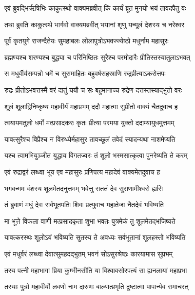 
\twolineshloka
{एवं ब्रुवद्भिर्ऋषिभिः काकुत्स्थो वाक्यमब्रवीत्}
{किं कार्यं ब्रूत मुनयो भयं तावदपैतु वः} %

\twolineshloka
{तथा ब्रुवति काकुत्स्थे भार्गवो वाक्यमब्रवीत्}
{भयानां शृणु यन्मूलं देशस्य च नरेश्वर} %

\twolineshloka
{पूर्वं कृतयुगे राजन्दैतेयः सुमहाबलः}
{लोलापुत्रोऽभवज्ज्येष्ठो मधुर्नाम महासुरः} %

\twolineshloka
{ब्रह्मण्यश्च शरण्यश्च बुद्ध्या च परिनिष्ठितः}
{सुरैश्च परमोदारैः प्रीतिस्तस्यातुलाऽभवत्} %

\twolineshloka
{स मधुर्वीर्यसम्पन्नो धर्मे च सुसमाहितः}
{बहुवर्षसहस्राणि रुद्रप्रीत्याऽकरोत्तपः} %

\twolineshloka
{रुद्रः प्रीतोऽभवत्तस्मै वरं दातुं ययौ च सः}
{बहुमानाच्च रुद्रेण दत्तस्तस्याद्भुतो वरः} %

\twolineshloka
{शूलं शूलाद्विनिष्कृष्य महावीर्यं महाप्रभम्}
{ददौ महात्मा सुप्रीतो वाक्यं चैतदुवाच ह} %

\twolineshloka
{त्वयायमतुलो धर्मो मत्प्रसादकरः कृतः}
{प्रीत्या परमया युक्तो ददाम्यायुधमुत्तमम्} %

\twolineshloka
{यावत्सुरैश्च विप्रैश्च न विरुध्येर्महासुर}
{तावच्छूलं तवेदं स्यादन्यथा नाशमेप्यति} %

\twolineshloka
{यश्च त्वामभियुञ्जीत युद्धाय विगतज्वरः}
{तं शूलो भस्मसात्कृत्वा पुनरेष्यति ते करम्} %

\twolineshloka
{एवं रुद्राद्वरं लब्ध्वा भूय एव महासुरः}
{प्रणिपत्य महादेवं वाक्यमेतदुवाच ह} %

\twolineshloka
{भगवन्मम वंशस्य शूलमेतदनुत्तमम्}
{भवेत्तु सततं देव सुराणामीश्वरो ह्यसि} %

\twolineshloka
{तं ब्रुवाणं मधुं देवः सर्वभूतपतिः शिवः}
{प्रत्युवाच महातेजा नैतदेवं भविष्यति} %

\twolineshloka
{मा भूत्ते विफला वाणी मत्प्रसादकृता शुभा}
{भवतः पुत्रमेकं तु शूलमेतद्भजिष्यते} %

\twolineshloka
{यावत्करस्थः शूलोऽयं भविष्यति सुतस्य ते}
{अवध्यः सर्वभूतानां शूलहस्तो भविष्यति} %

\twolineshloka
{एवं मधुर्वरं लब्ध्वा देवात्सुमहदद्भुतम्}
{भवनं सोऽसुरश्रेष्ठः कारयामास सुप्रभम्} %

\twolineshloka
{तस्य पत्नी महाभागा प्रिया कुम्भीनसीति या}
{विश्वावसोरपत्यं सा ह्यनलायां महाप्रभा} %

\twolineshloka
{तस्याः पुत्रो महावीर्यो लवणो नाम दारुणः}
{बाल्यात्प्रभृति दुष्टात्मा पापान्येव समाचरत्} %


